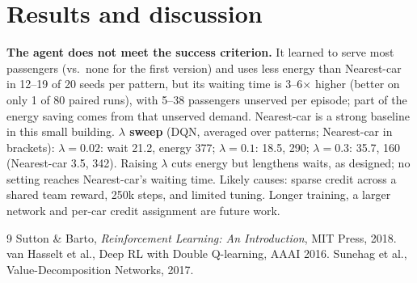\documentclass[10pt,twocolumn]{article}
\begin{document}
\section{Results and discussion}
\textbf{The agent does not meet the success criterion.} It learned to serve most passengers (vs.\ none for the first version) and uses less energy than Nearest-car in 12--19 of 20 seeds per pattern, but its waiting time is 3--6$\times$ higher (better on only 1 of 80 paired runs), with 5--38 passengers unserved per episode; part of the energy saving comes from that unserved demand. Nearest-car is a strong baseline in this small building. \textbf{$\lambda$ sweep} (DQN, averaged over patterns; Nearest-car in brackets): $\lambda=0.02$: wait 21.2, energy 377; $\lambda=0.1$: 18.5, 290; $\lambda=0.3$: 35.7, 160 (Nearest-car 3.5, 342). Raising $\lambda$ cuts energy but lengthens waits, as designed; no setting reaches Nearest-car's waiting time. Likely causes: sparse credit across a shared team reward, 250k steps, and limited tuning. Longer training, a larger network and per-car credit assignment are future work.
\begin{thebibliography}{9}\small
{} Sutton \& Barto, \emph{Reinforcement Learning: An Introduction}, MIT Press, 2018.
 van Hasselt et al., Deep RL with Double Q-learning, AAAI 2016.
 Sunehag et al., Value-Decomposition Networks, 2017.
\end{thebibliography}
\end{document}
